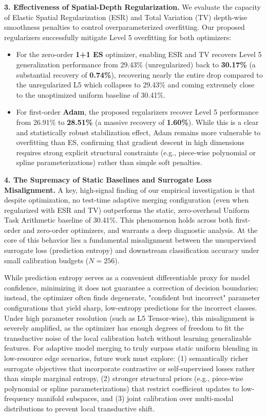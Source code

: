 \textbf{3. Effectiveness of Spatial-Depth Regularization.} 
We evaluate the capacity of Elastic Spatial Regularization (ESR) and Total Variation (TV) depth-wise smoothness penalties to control overparameterized overfitting. 
Our proposed regularizers successfully mitigate Level 5 overfitting for both optimizers:
\begin{itemize}
    \item For the zero-order \textbf{1+1 ES} optimizer, enabling ESR and TV recovers Level 5 generalization performance from 29.43\% (unregularized) back to \textbf{30.17\%} (a substantial recovery of \textbf{0.74\%}), recovering nearly the entire drop compared to the unregularized L5 which collapses to 29.43\% and coming extremely close to the unoptimized uniform baseline of 30.41\%.
    \item For first-order \textbf{Adam}, the proposed regularizers recover Level 5 performance from 26.91\% to \textbf{28.51\%} (a massive recovery of \textbf{1.60\%}). While this is a clear and statistically robust stabilization effect, Adam remains more vulnerable to overfitting than ES, confirming that gradient descent in high dimensions requires strong explicit structural constraints (e.g., piece-wise polynomial or spline parameterizations) rather than simple soft penalties.
\end{itemize}

\textbf{4. The Supremacy of Static Baselines and Surrogate Loss Misalignment.} 
A key, high-signal finding of our empirical investigation is that despite optimization, no test-time adaptive merging configuration (even when regularized with ESR and TV) outperforms the static, zero-overhead Uniform Task Arithmetic baseline of 30.41\%. This phenomenon holds across both first-order and zero-order optimizers, and warrants a deep diagnostic analysis. At the core of this behavior lies a fundamental misalignment between the unsupervised surrogate loss (prediction entropy) and downstream classification accuracy under small calibration budgets ($N=256$). 

While prediction entropy serves as a convenient differentiable proxy for model confidence, minimizing it does not guarantee a correction of decision boundaries; instead, the optimizer often finds degenerate, "confident but incorrect" parameter configurations that yield sharp, low-entropy predictions for the incorrect classes. Under high parameter resolution (such as L5 Tensor-wise), this misalignment is severely amplified, as the optimizer has enough degrees of freedom to fit the transductive noise of the local calibration batch without learning generalizable features. For adaptive model merging to truly surpass static uniform blending in low-resource edge scenarios, future work must explore: (1) semantically richer surrogate objectives that incorporate contrastive or self-supervised losses rather than simple marginal entropy, (2) stronger structural priors (e.g., piece-wise polynomial or spline parameterizations) that restrict coefficient updates to low-frequency manifold subspaces, and (3) joint calibration over multi-modal distributions to prevent local transductive shift.


